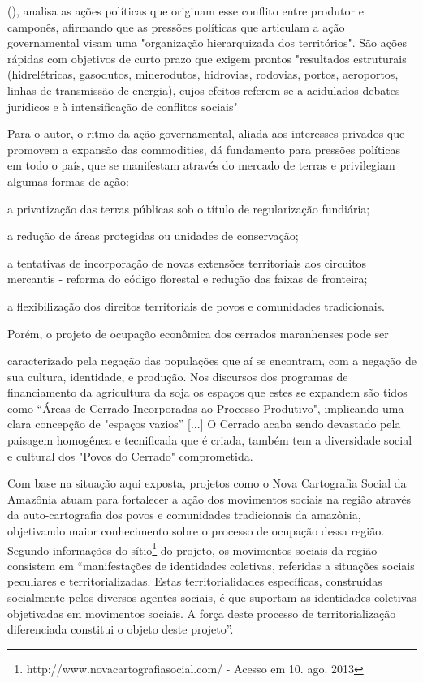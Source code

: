  (\citeyear{almeida}), analisa as ações políticas que originam esse conflito entre produtor e camponês, afirmando que as pressões políticas que articulam a ação governamental visam uma "organização hierarquizada dos territórios". São ações rápidas com objetivos de curto prazo que exigem prontos "resultados estruturais (hidrelétricas, gasodutos, minerodutos, hidrovias, rodovias, portos, aeroportos, linhas de transmissão de energia), cujos efeitos referem-se a acidulados debates jurídicos e à intensificação de conflitos sociais" \cite{almeida}

Para o autor, o ritmo da ação governamental, aliada aos interesses privados que promovem a expansão das commodities, dá fundamento para pressões políticas em todo o país, que se manifestam através do mercado de terras e privilegiam algumas formas de ação:

\begin{alineas}
   \item a privatização das terras públicas sob o título de regularização fundiária;
   \item a redução de áreas protegidas ou unidades de conservação;
   \item a tentativas de incorporação de novas extensões territoriais aos circuitos mercantis - reforma do código florestal e redução das faixas de fronteira;
   \item a flexibilização dos direitos territoriais de povos e comunidades tradicionais.
\end{alineas}

Porém, o projeto de ocupação econômica dos cerrados maranhenses pode ser 

\begin{citacao}
caracterizado pela negação das populações que aí se encontram, com a negação de sua cultura, identidade, e produção. Nos discursos dos programas de financiamento da agricultura da soja os espaços que estes se expandem são tidos como “Áreas de Cerrado Incorporadas ao Processo Produtivo", implicando uma clara concepção de "espaços vazios” [...] O Cerrado acaba sendo devastado pela paisagem homogênea e tecnificada que é criada,  também tem a diversidade social e cultural dos "Povos do Cerrado" comprometida. \cite[p. 13]{rodrigues_alencar}
\end{citacao}

Com base na situação aqui exposta, projetos como o Nova Cartografia Social da Amazônia atuam para fortalecer a ação dos movimentos sociais na região através da auto-cartografia dos povos e comunidades tradicionais da amazônia, objetivando maior conhecimento sobre o processo de ocupação dessa região. Segundo informações do sítio\footnote{http://www.novacartografiasocial.com/ - Acesso em 10. ago. 2013} do projeto, os movimentos sociais da região consistem em “manifestações de identidades coletivas, referidas a situações sociais peculiares e territorializadas. Estas territorialidades específicas, construídas socialmente pelos diversos agentes sociais, é que suportam as identidades coletivas objetivadas em movimentos sociais. A força deste processo de territorialização diferenciada constitui o objeto deste projeto”.

